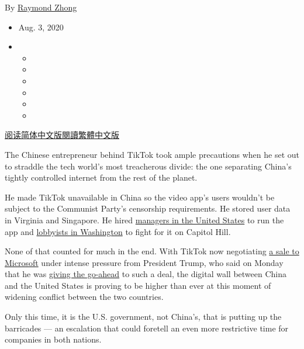 By \href{https://www.nytimes.com/by/raymond-zhong}{Raymond Zhong}

\begin{itemize}
\item
  Aug. 3, 2020
\item
  \begin{itemize}
  \item
  \item
  \item
  \item
  \item
  \item
  \end{itemize}
\end{itemize}

\href{https://cn.nytimes.com/technology/20200804/tiktok-trump-sale-microsoft/}{阅读简体中文版}\href{https://cn.nytimes.com/technology/20200804/tiktok-trump-sale-microsoft/zh-hant/}{閱讀繁體中文版}

The Chinese entrepreneur behind TikTok took ample precautions when he
set out to straddle the tech world's most treacherous divide: the one
separating China's tightly controlled internet from the rest of the
planet.

He made TikTok unavailable in China so the video app's users wouldn't be
subject to the Communist Party's censorship requirements. He stored user
data in Virginia and Singapore. He hired
\href{https://www.nytimes.com/2020/05/18/business/media/tiktok-ceo-kevin-mayer.html}{managers
in the United States} to run the app and
\href{https://www.nytimes.com/2020/07/15/technology/tiktok-washington-lobbyist.html}{lobbyists
in Washington} to fight for it on Capitol Hill.

None of that counted for much in the end. With TikTok now negotiating
\href{https://www.nytimes.com/2020/08/02/business/economy/trump-tiktok-china-national-security.html}{a
sale to Microsoft} under intense pressure from President Trump, who said
on Monday that he was
\href{https://www.nytimes.com/2020/08/03/technology/trump-tiktok-microsoft.html?action=click\&module=Top\%20Stories\&pgtype=Homepage}{giving
the go-ahead} to such a deal, the digital wall between China and the
United States is proving to be higher than ever at this moment of
widening conflict between the two countries.

Only this time, it is the U.S. government, not China's, that is putting
up the barricades --- an escalation that could foretell an even more
restrictive time for companies in both nations.

